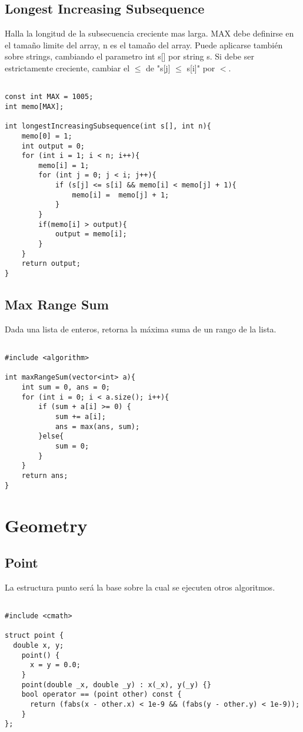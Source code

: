 \documentclass[11pt,letterpaper,twocolumn,twosided]{article}
\begin{document}
\subsection{Longest Increasing Subsequence}
Halla la longitud de la subsecuencia creciente mas larga. MAX debe definirse en el tamaño  limite del array, n es el tamaño del array. Puede aplicarse tambi\'en sobre strings, cambiando el parametro int s[] por string s. Si debe ser estrictamente creciente, cambiar el $\leq $ de "s[j] $\leq $ s[i]" por $<$.
\begin{lstlisting}

const int MAX = 1005;
int memo[MAX];

int longestIncreasingSubsequence(int s[], int n){
	memo[0] = 1;
	int output = 0;
	for (int i = 1; i < n; i++){
		memo[i] = 1;
		for (int j = 0; j < i; j++){
			if (s[j] <= s[i] && memo[i] < memo[j] + 1){
				memo[i] =  memo[j] + 1;
			} 
		}
		if(memo[i] > output){
			output = memo[i];
		}
	}
	return output;
}
\end{lstlisting}

\subsection{Max Range Sum}
Dada una lista de enteros, retorna la m\'axima suma de un rango de la lista.
\begin{lstlisting}

#include <algorithm>

int maxRangeSum(vector<int> a){
	int sum = 0, ans = 0;
	for (int i = 0; i < a.size(); i++){
		if (sum + a[i] >= 0) {  
			sum += a[i];
		    ans = max(ans, sum);          
	    }else{
	    	sum = 0;
	    }
	}
	return ans;
}
\end{lstlisting}

\section{Geometry}

\subsection{Point}
La estructura punto ser\'a la base sobre la cual se ejecuten otros algoritmos.
\begin{lstlisting}

#include <cmath>

struct point { 
  double x, y;
    point() { 
      x = y = 0.0; 
    }
    point(double _x, double _y) : x(_x), y(_y) {}        
    bool operator == (point other) const {
      return (fabs(x - other.x) < 1e-9 && (fabs(y - other.y) < 1e-9)); 
    }
};

\end{lstlisting}
\end{document}
